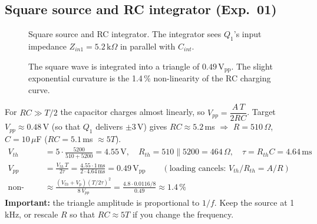 \subsection{Square source and RC integrator (Exp.\ 01)}
\begin{figure}[H]
\centering
{}
\caption{Square source and RC integrator. The integrator sees $Q_1$'s input impedance $Z_{in1}=5.2\,\mathrm{k}\Omega$ in parallel with $C_{int}$.}
\end{figure}

\begin{figure}[H]
\centering
{}
\caption{The square wave is integrated into a triangle of $0.49\,\mathrm{V_{pp}}$. The slight exponential curvature is the 1.4\,\% non-linearity of the RC charging curve.}
\end{figure}

\begin{tcolorbox}[colback=blue!3,colframe=blue!40!black,title=Calculations,fonttitle=\small\bfseries,boxrule=0.4pt]
\small
For $RC\gg T/2$ the capacitor charges almost linearly, so $V_{pp}=\dfrac{A\,T}{2RC}$. Target $V_{pp}\approx0.48$\,V (so that $Q_1$ delivers $\pm3$\,V) gives $RC\approx5.2$\,ms $\Rightarrow$ $R=510\,\Omega$, $C=10\,\mu$F ($RC=5.1$\,ms $\approx5T$).
\begin{align*}
V_{th}&=5\cdot\frac{5200}{510+5200}=4.55\,\mathrm V,\quad R_{th}=510\parallel5200=464\,\Omega,\quad \tau=R_{th}C=4.64\,\mathrm{ms}\\
V_{pp}&=\frac{V_{th}\,T}{2\tau}=\frac{4.55\cdot1\,\mathrm{ms}}{2\cdot4.64\,\mathrm{ms}}=0.49\,\mathrm{V_{pp}}\qquad(\text{loading cancels: }V_{th}/R_{th}=A/R)\\
\text{non-linearity}&\approx\frac{(V_{th}+V_p)(T/2\tau)^2}{8\,V_{pp}}=\frac{4.8\cdot0.0116/8}{0.49}\approx1.4\,\%
\end{align*}
\textbf{Important:} the triangle amplitude is proportional to $1/f$. Keep the source at 1\,kHz, or rescale $R$ so that $RC\approx5T$ if you change the frequency.
\end{tcolorbox}

